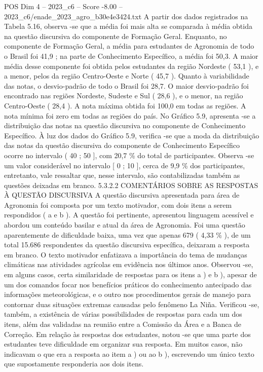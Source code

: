 \begin{textsample}{POS Dim 4 – 2023\_c6 – Score -8.00 – 2023\_c6/enade\_2023\_agro\_b30e4e3424.txt}
A partir dos dados registrados na Tabela 5.16, observa -se que a média foi mais alta se comparada à média obtida na questão discursiva do componente de Formação Geral.
Enquanto, no componente de Formação Geral, a média para estudantes de Agronomia de todo o Brasil foi 41,9 ; na parte de Conhecimento Específico, a média foi 50,3.
A maior média desse componente foi obtida pelos estudantes da região Nordeste ( 53,1 ), e a menor, pelos da região Centro-Oeste e Norte ( 45,7 ).
Quanto à variabilidade das notas, o desvio-padrão de todo o Brasil foi 28,7.
O maior desvio-padrão foi encontrado nas regiões Nordeste, Sudeste e Sul ( 28,6 ), e o menor, na região Centro-Oeste ( 28,4 ).
A nota máxima obtida foi 100,0 em todas as regiões.
A nota mínima foi zero em todas as regiões do país.
No Gráfico 5.9, apresenta -se a distribuição das notas na questão discursiva no componente de Conhecimento Específico.
À luz dos dados do Gráfico 5.9, verifica -se que a moda da distribuição das notas da questão discursiva do componente de Conhecimento Específico ocorre no intervalo ( 40 ; 50 ], com 20,7 \% do total de participantes.
Observa -se um valor considerável no intervalo [ 0 ; 10 ], cerca de 9,9 \% dos participantes, entretanto, vale ressaltar que, nesse intervalo, são contabilizadas também as questões deixadas em branco. 5.3.2.2 COMENTÁRIOS SOBRE AS RESPOSTAS À QUESTÃO DISCURSIVA A questão discursiva apresentada para área de Agronomia foi composta por um texto motivador, com dois itens a serem respondidos ( a e b ).
A questão foi pertinente, apresentou linguagem acessível e abordou um conteúdo basilar e atual da área de Agronomia.
Foi uma questão aparentemente de dificuldade baixa, uma vez que apenas 679 ( 4,33 \% ), de um total 15.686 respondentes da questão discursiva específica, deixaram a resposta em branco.
O texto motivador enfatizava a importância do tema de mudanças climáticas nas atividades agrícolas em evidência nos últimos anos.
Observou -se, em alguns casos, certa similaridade de respostas para os itens a ) e b ), apesar de um dos comandos focar nos benefícios práticos do conhecimento antecipado das informações meteorológicas, e o outro nos procedimentos gerais de manejo para contornar duas situações extremas causadas pelo fenômeno La Niña.
Verificou -se, também, a existência de várias possibilidades de respostas para cada um dos itens, além das validadas na reunião entre a Comissão da Área e a Banca de Correção.
Em relação às respostas dos estudantes, notou -se que uma parte dos estudantes teve dificuldade em organizar sua resposta.
Em muitos casos, não indicavam o que era a resposta ao item a ) ou ao b ), escrevendo um único texto que supostamente responderia aos dois itens.

\end{textsample}
